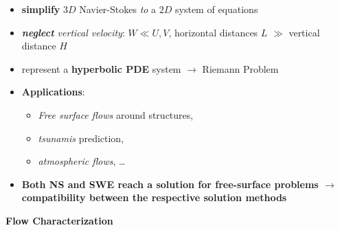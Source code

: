 \begin{frame}
\begin{itemize}
\setlength\itemsep{1.8em}
\item<1-> \textbf{simplify} \textit{$3D$} Navier-Stokes \textit{to} a \textit{$2D$} system of equations
\item<2-> \textit{\textbf{neglect} vertical velocity}:  $ W \ll U,V $, horizontal distances $L$ $\gg$ vertical distance $H$
\item<3-> represent a \textbf{hyperbolic PDE} system $\rightarrow$ Riemann Problem
\item<4-> \textbf{Applications}: 
\begin{itemize}
\addtolength{\itemindent}{1cm}
\item \textit{Free surface flows} around structures, 
\item \textit{tsunamis} prediction,
\item \textit{atmospheric flows}, \dots
\end{itemize}
\item<5->[]
\begin{tcolorbox}[%
colback=white] 
\textbf{Both NS and SWE reach a solution for free-surface problems $\rightarrow$ compatibility between the respective solution methods}
\end{tcolorbox}
\end{itemize}
\end{frame}
\clearpage


\begin{frame}
    \vspace{4cm}
\centering
{\Huge\textbf{Flow Characterization}}
\end{frame}


